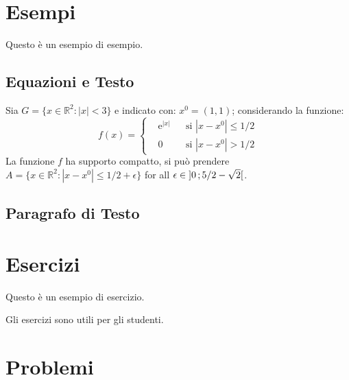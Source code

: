 \section{Esempi}

Questo è un esempio di esempio.

\subsection{Equazioni e Testo}

\begin{example}
Sia $G=\{x\in\mathbb{R}^2:|x|<3\}$ e indicato con: $x^0=(1,1)$; considerando la funzione:
\begin{equation}
f(x)=\left\{\begin{aligned} & \mathrm{e}^{|x|} & & \text{si $|x-x^0|\leq 1/2$}\\
& 0 & & \text{si $|x-x^0|> 1/2$}\end{aligned}\right.
\end{equation}
La funzione $f$ ha supporto compatto, si può prendere $A=\{x\in\mathbb{R}^2:|x-x^0|\leq 1/2+\epsilon\}$ for all $\epsilon\in\mathopen{]}0\,;5/2-\sqrt{2}\mathclose{[}$.
\end{example}

\subsection{Paragrafo di Testo}

\begin{example}
\lipsum[2]
\end{example}


\section{Esercizi}

Questo è un esempio di esercizio.

\begin{exercise}
Gli esercizi sono utili per gli studenti.
\end{exercise}


\section{Problemi}

